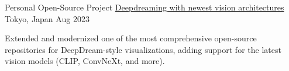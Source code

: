 \begin{cventries}


\cventry
  {Personal Open-Source Project} %
  {\href{https://github.com/Dundalia/pytorch-deepdream}{Deepdreaming with newest vision architectures}} 
  {Tokyo, Japan} %
  {Aug 2023} %
  {
    \begin{cvitems} %
      \item {Extended and modernized one of the most comprehensive open-source repositories for DeepDream-style visualizations, adding support for the latest vision models (CLIP, ConvNeXt, and more).}
    \end{cvitems}
  }



\end{cventries}
